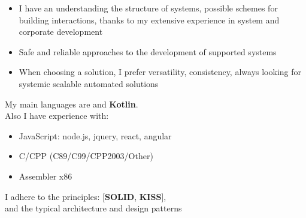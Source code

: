     \begin{minipage}[t]{0.4\textwidth} %
        \vspace{-\baselineskip} %
        

        \begin{itemize}[leftmargin=-.0in]
            \item I have an understanding the structure of systems, possible schemes for building interactions, thanks to my extensive experience in system and corporate development
            \item Safe and reliable approaches to the development of supported systems
            \item When choosing a solution, I prefer versatility, consistency, always looking for systemic scalable automated solutions
        \end{itemize}

    \end{minipage}
    \hfill %
    \begin{minipage}[t]{0.5\textwidth} %
        \vspace{-\baselineskip}
        
        
        My main languages are  and \textbf{Kotlin}.\\
        Also I have experience with:
        \begin{itemize}[leftmargin=.2in]
            \item{JavaScript: node.js, jquery, react, angular}
            \item{C/CPP (C89/C99/CPP2003/Other)}
            \item{Assembler x86}
        \end{itemize}

        I adhere to the principles: [\textbf{SOLID}, \textbf{KISS}],\\
        and the typical architecture and design patterns
    \end{minipage}

\vspace{0.5cm}